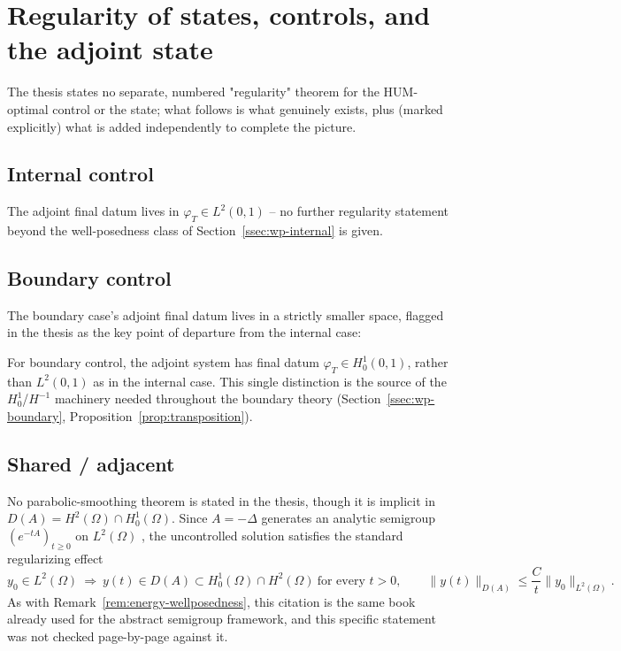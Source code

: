 \section{Regularity of states, controls, and the adjoint state}
\label{sec:regularity}

The thesis states no separate, numbered "regularity" theorem for the
HUM-optimal control or the state; what follows is what genuinely exists,
plus (marked explicitly) what is added independently to complete the picture.

\subsection{Internal control}

The adjoint final datum lives in $\varphi_T \in L^2(0,1)$ -- no further
regularity statement beyond the well-posedness class of
Section~\ref{ssec:wp-internal} is given.

\subsection{Boundary control}

The boundary case's adjoint final datum lives in a strictly smaller space,
flagged in the thesis as the key point of departure from the internal case:

\begin{remark}
  \label{rem:boundary-h10}
  For boundary control, the adjoint system has final datum
  $\varphi_T \in H^1_0(0,1)$, rather than $L^2(0,1)$ as in the internal case.
  This single distinction is the source of the $H^1_0$/$H^{-1}$ machinery
  needed throughout the boundary theory (Section~\ref{ssec:wp-boundary},
  Proposition~\ref{prop:transposition}).
\end{remark}

\subsection{Shared / adjacent}

\begin{remark}
  \label{rem:smoothing}
  No parabolic-smoothing theorem is stated in the thesis, though it is
  implicit in $D(A) = H^2(\Omega)\cap H^1_0(\Omega)$. Since $A=-\Delta$
  generates an analytic semigroup $(e^{-tA})_{t\ge0}$ on $L^2(\Omega)$
  \citep{pazy2012semigroups}, the uncontrolled solution satisfies the standard
  regularizing effect
  \[
    y_0 \in L^2(\Omega) \ \Longrightarrow\
    y(t) \in D(A) \subset H^1_0(\Omega)\cap H^2(\Omega) \ \text{for every } t>0,
    \qquad \|y(t)\|_{D(A)} \le \frac{C}{t}\|y_0\|_{L^2(\Omega)}.
  \]
  As with Remark~\ref{rem:energy-wellposedness}, this citation is the same
  book already used for the abstract semigroup framework, and this specific
  statement was not checked page-by-page against it.
\end{remark}

